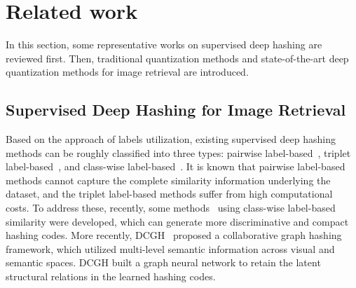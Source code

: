\documentclass{elsarticle}
\begin{document}
\section{Related work} \label{sec:2}
In this section, some representative works on supervised deep hashing are reviewed first. Then, traditional quantization methods and state-of-the-art deep quantization methods for image retrieval are introduced.

\subsection{Supervised Deep Hashing for Image Retrieval}
Based on the approach of labels utilization, existing supervised deep hashing methods can be roughly classified into three types: pairwise label-based~\cite{li2016feature,fu2022deep}, triplet label-based~\cite{wang2016deep,yao2016deep}, and class-wise label-based~\cite{zhe2019deep,Yuan_2020_CVPR}. It is known that pairwise label-based methods cannot capture the complete similarity information underlying the dataset, and the triplet label-based methods suffer from high computational costs. To address these, 
recently, some methods~\cite{zhe2019deep,Yuan_2020_CVPR,zhang2021improved} using class-wise label-based similarity were developed, which can generate more discriminative and compact hashing codes. More recently, DCGH~\cite{zhang2023deep} proposed a collaborative graph hashing framework, which utilized multi-level semantic information across visual and semantic spaces. DCGH built a graph neural network to retain the latent structural relations in the learned hashing codes.
\end{document}

